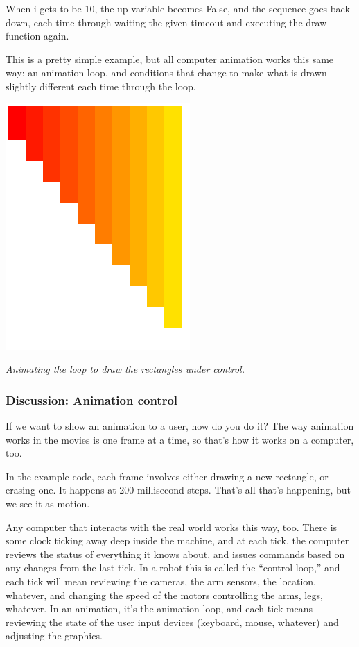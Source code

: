 \documentclass[11pt]{article}
\newcommand{\capt}[1]{\begin{minipage}{0.75\columnwidth}\itshape#1\end{minipage}}
\begin{document}
When i gets to be 10, the up variable becomes False, and the sequence
goes back down, each time through waiting the given timeout and
executing the draw function again.

This is a pretty simple example, but all computer animation works this
same way: an animation loop, and conditions that change to make what
is drawn slightly different each time through the loop.

\begin{center}
\includegraphics[width=0.5\columnwidth]{animation.png}

\capt{Animating the loop to draw the rectangles under control.}
\end{center}


\subsubsection{Discussion: Animation control}

If we want to show an animation to a user, how do you do it?  The way
animation works in the movies is one frame at a time, so that's how it
works on a computer, too.

In the example code, each frame involves either drawing a new
rectangle, or erasing one.  It happens at 200-millisecond steps.
That's all that's happening, but we see it as motion.

Any computer that interacts with the real world works this way, too.
There is some clock ticking away deep inside the machine, and at each
tick, the computer reviews the status of everything it knows about,
and issues commands based on any changes from the last tick.  In a
robot this is called the ``control loop,'' and each tick will mean reviewing
the cameras, the arm sensors, the location, whatever, and changing the
speed of the motors controlling the arms, legs, whatever.  In an
animation, it's the animation loop, and each tick means reviewing the
state of the user input devices (keyboard, mouse, whatever) and
adjusting the graphics.
\end{document}
